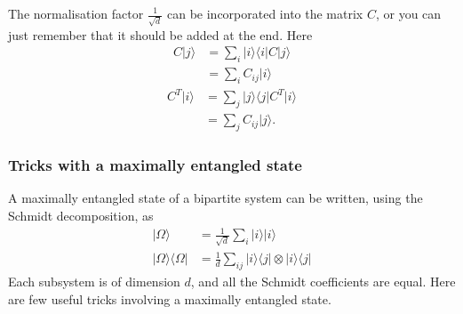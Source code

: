 \documentclass[fleqn]{article}
\begin{document}
The normalisation factor \(\frac{1}{\sqrt d}\) can be incorporated into the matrix \(C\), or you can just remember that it should be added at the end.
Here
\[
  \begin{aligned}
    C|j\rangle
    &= \sum_i |i\rangle\langle i|C|j\rangle
  \\&= \sum_i C_{ij}|i\rangle
  \end{aligned}
\]
\[
  \begin{aligned}
    C^T|i\rangle
    &= \sum_j |j\rangle\langle j|C^T|i\rangle
  \\&= \sum_j C_{ij}|j\rangle.
  \end{aligned}
\]

\hypertarget{tricks-with-a-maximally-entangled-state}{%
\subsubsection{Tricks with a maximally entangled state}\label{tricks-with-a-maximally-entangled-state}}

A maximally entangled state of a bipartite system can be written, using the Schmidt decomposition, as
\[
  \begin{aligned}
    |\Omega\rangle
    &= \frac{1}{\sqrt d}\sum_i |i\rangle|i\rangle
  \\|\Omega\rangle\langle\Omega|
    &= \frac{1}{d} \sum_{ij}|i\rangle\langle j|\otimes|i\rangle\langle j|
  \end{aligned}
\]
Each subsystem is of dimension \(d\), and all the Schmidt coefficients are equal.
Here are few useful tricks involving a maximally entangled state.
\end{document}
